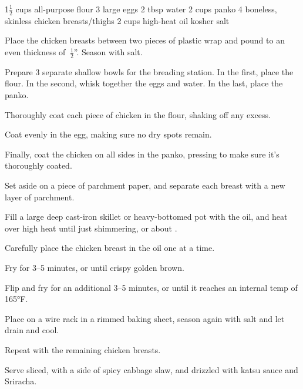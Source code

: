\dishtype{}
\begin{ingreds}
    1$\frac{1}{2}$ cups all-purpose flour
    3 large eggs
    2 tbsp water
    2 cups panko
    4 boneless, skinless chicken breasts/thighs
    2 cups high-heat oil
    kosher salt
\end{ingreds}
\begin{method}
    Place the chicken breasts between two pieces of plastic wrap and pound to an even thickness of $~\frac{1}{2}$''. Season with salt.\par
    Prepare 3 separate shallow bowls for the breading station. In the first, place the flour. In the second, whisk together the eggs and water. In the last, place the panko.\par
    Thoroughly coat each piece of chicken in the flour, shaking off any excess.\par
    Coat evenly in the egg, making sure no dry spots remain.\par
    Finally, coat the chicken on all sides in the panko, pressing to make sure it's thoroughly coated.\par
    Set aside on a piece of parchment paper, and separate each breast with a new layer of parchment.\par
    Fill a large deep cast-iron skillet or heavy-bottomed pot with the oil, and heat over high heat until just shimmering, or about .\par
    Carefully place the chicken breast in the oil one at a time.\par
    Fry for 3--5 minutes, or until crispy golden brown.\par
    Flip and fry for an additional 3--5 minutes, or until it reaches an internal temp of 165°F.\par
    Place on a wire rack in a rimmed baking sheet, season again with salt and let drain and cool.\par Repeat with the remaining chicken breasts.\par
    Serve sliced, with a side of spicy cabbage slaw, and drizzled with katsu sauce and Sriracha.
\end{method}